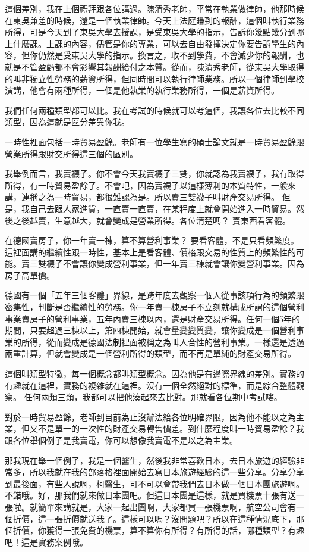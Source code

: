 \documentclass[]{ctexbook}
\begin{document}
這個差別，我在上個禮拜跟各位講過。陳清秀老師，平常在執業做律師，他那時候在東吳兼差的時候，還是一個執業律師。今天上法庭賺到的報酬，這個叫執行業務所得，可是今天到了東吳大學去授課，是受東吳大學的指示，告訴你幾點幾分到哪上什麼課。上課的內容，儘管是你的專業，可以去自由發揮決定你要告訴學生的內容，但你仍然是受東吳大學的指示。換言之，收不到學費，不會減少你的報酬，也就是不管盈虧都不會影響其報酬給付之本質。從而，陳清秀老師，從東吳大學取得的叫非獨立性勞務的薪資所得，但同時間可以執行律師業務。所以一個律師到學校演講，他會有兩種所得，一個是他執業的執行業務所得，一個是薪資所得。

我們任何兩種類型都可以比。我在考試的時候就可以考這個，我讓各位去比較不同類型，因為這就是區分差異你我。

一時性裡面包括一時貿易盈餘。老師有一位學生寫的碩士論文就是一時貿易盈餘跟營業所得跟財交所得這三個的區別。

我舉例而言，我賣襪子。你不會今天我賣襪子三雙，你就認為我賣襪子，我有取得所得，有一時貿易盈餘了。不會吧，因為賣襪子以這樣薄利的本質特性，一般來講，連稱之為一時貿易，都很難認為是。所以賣三雙襪子叫財產交易所得。
但是，我自己去跟人家進貨，一直賣一直賣，在某程度上就會開始進入一時貿易。然後之後越賣，生意越大，就會變成是營業所得。各位清楚嗎？ 賣東西看客體。

在德國賣房子，你一年賣一棟，算不算營利事業？ 要看客體，不是只看頻繁度。這裡面講的繼續性跟一時性，基本上是看客體、價格跟交易的性質上的頻繁性的可能。賣三雙襪子不會讓你變成營利事業，但一年賣三棟就會讓你變營利事業。因為房子高單價。

德國有一個「五年三個客體」界線，是跨年度去觀察一個人從事該項行為的頻繁跟密集性，判斷是否繼續性的勞務。你一年賣一棟房子不立刻就構成所謂的這個營利事業賣房子的營利事業，五年內賣三棟以內，還是財產交易所得。任何一個5年的期間，只要超過三棟以上，第四棟開始，就會量變變質變，讓你變成是一個營利事業的所得，從而變成是德國法制裡面被稱之為叫人合性的營利事業。一樣還是透過兩重計算，但就會變成是一個營利所得的類型，而不再是單純的財產交易所得。

這個叫類型特徵，每一個概念都叫類型概念。因為他是有邊際界線的差別。實務的有趣就在這裡，實務的複雜就在這裡。沒有一個全然絕對的標準，而是綜合整體觀察。
任何兩類三類，我都可以把他湊起來去比對。那就看各位期中考試嘍。

對於一時貿易盈餘，老師到目前為止沒辦法給各位明確界限，因為他不能以之為主業，但又不是單一的一次性的財產交易轉售價差。到什麼程度叫一時貿易盈餘？我跟各位舉個例子是我賣電，你可以想像我賣電不是以之為主業。

那我現在舉一個例子，我是一個醫生，然後我非常喜歡日本，去日本旅遊的經驗非常多，所以我就在我的部落格裡面開始去寫日本旅遊經驗的這一些分享。分享分享到最後面，有些人說啊，柯醫生，可不可以會帶我們去日本做一個日本團旅遊啊。不錯哦。好，那我們就來做日本團吧。但這日本團是這樣，就是買機票十張有送一張啦。就簡單來講就是，大家一起出團啊，大家都買一張機票啊，航空公司會有一個折價，這一張折價就送我了。這樣可以嗎？沒問題吧？所以在這種情況底下，那個折價，你獲得一張免費的機票，算不算你有所得？有所得的話，哪種類型？有趣吧！這是實務案例哦。
\end{document}
